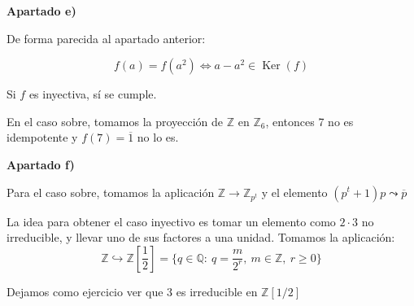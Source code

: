 \documentclass[openany]{book}
\begin{document}
\begin{exercise}
\begin{flushright}
    \textbf{Apartado e)}
\end{flushright}

De forma parecida al apartado anterior:

$$ f(a) = f(a^2)\iff a-a^2 \in \operatorname{Ker}(f) $$

Si $ f $ es inyectiva, sí se cumple. 

En el caso sobre, tomamos la proyección de $ \mathbb{Z} $ en $ \mathbb{Z}_{6} $, entonces 7 no es idempotente y $ f(7) = \overline{1} $ no lo es.

\begin{flushright}
    \textbf{Apartado f)}
\end{flushright}





Para el caso sobre, tomamos la aplicación $ \mathbb{Z} \to \mathbb{Z}_{p^{t}} $ y el elemento $ (p^{t}+1)p \leadsto \overline{p} $

La idea para obtener el caso inyectivo es tomar un elemento como $ 2\cdot 3 $ no irreducible, y llevar uno de sus factores a una unidad. Tomamos la aplicación:
$$ \mathbb{Z} \hookrightarrow \mathbb{Z}\left[\dfrac{1}{2}\right] = \{q \in \mathbb{Q}:\ q = \dfrac{m}{2^{r}},\ m \in \mathbb{Z},\ r\geq  0\} $$

Dejamos como ejercicio ver que 3 es irreducible en $ \mathbb{Z}[1/2] $

\end{exercise}
\end{document}
